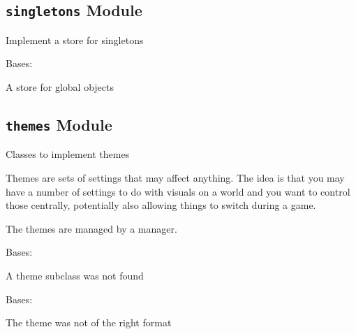 \documentclass[letterpaper,10pt,english]{sphinxmanual}
\begin{document}
\subsection{\texttt{singletons} Module}
\label{blocks:singletons-module}\label{blocks:module-serge.blocks.singletons}
Implement a store for singletons

\begin{fulllineitems}
\label{blocks:serge.blocks.singletons.SingletonStore}
Bases: {\hyperref[common:serge.registry.GeneralStore]{}}

A store for global objects

\end{fulllineitems}



\subsection{\texttt{themes} Module}
\label{blocks:themes-module}\label{blocks:module-serge.blocks.themes}
Classes to implement themes

Themes are sets of settings that may affect anything. The idea is that
you may have a number of settings to do with visuals on a world and you
want to control those centrally, potentially also allowing things
to switch during a game.

The themes are managed by a manager.

\begin{fulllineitems}
\label{blocks:serge.blocks.themes.BadInheritance}
Bases: 

A theme subclass was not found

\end{fulllineitems}


\begin{fulllineitems}
\label{blocks:serge.blocks.themes.BadThemeDefinition}
Bases: 

The theme was not of the right format

\end{fulllineitems}
\end{document}
